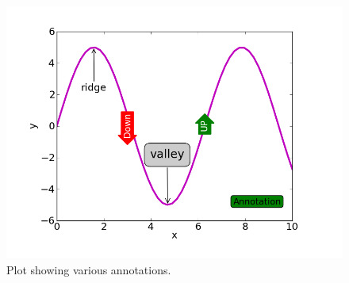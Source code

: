 \documentclass[10pt]{book}
\begin{document}
\beforefig
\begin{figure}[h!]
  \centering
    \includegraphics[scale=0.5]{images/annotate.png}
  \caption{Plot showing various annotations.}
   \label{fig:annotate}
\end{figure}
\afterfig
\end{document}
